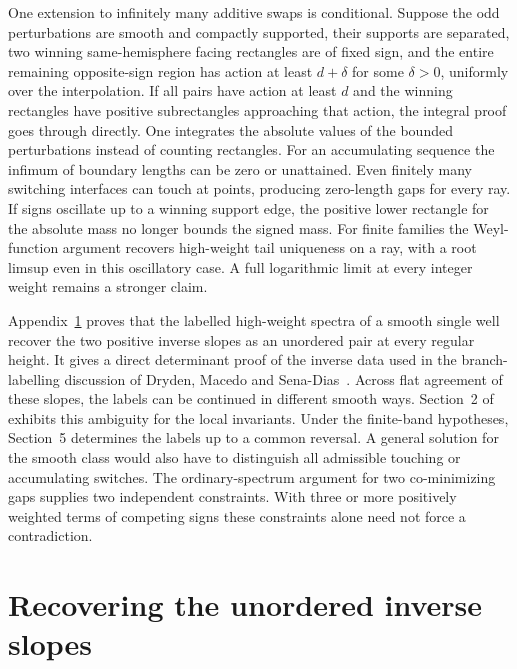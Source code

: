 \documentclass[11pt,letterpaper]{article}
\begin{document}
One extension to infinitely many additive swaps is conditional.
Suppose the odd perturbations are smooth and compactly supported, their
supports are separated, two winning same-hemisphere facing rectangles
are of fixed sign, and the entire remaining opposite-sign region has
action at least \(d+\delta\) for some \(\delta>0\), uniformly over the
interpolation. If all pairs have action at least \(d\) and the
winning rectangles have positive subrectangles approaching that action,
the integral proof goes through directly. One integrates the absolute
values of the bounded perturbations instead of counting rectangles.
For an accumulating sequence the infimum of boundary lengths can be
zero or unattained. Even finitely many switching interfaces can touch
at points, producing zero-length gaps for every ray. If signs oscillate
up to a winning support edge, the positive lower rectangle for the
absolute mass no longer bounds the signed mass. For finite families
the Weyl-function argument recovers high-weight tail uniqueness on
a ray, with a root limsup even in this oscillatory case. A full
logarithmic limit at every integer weight remains a stronger claim.

Appendix~\ref{app:inverse} proves that the labelled high-weight spectra
of a smooth single well recover the two positive inverse slopes as an
unordered pair at every regular height. It gives a direct determinant
proof of the inverse data used in the branch-labelling discussion of
Dryden, Macedo and Sena-Dias~\cite[final paragraph of Section~3]{dms}. Across flat agreement
of these slopes, the labels can be continued in different smooth ways.
Section~2 of \cite{original} exhibits this ambiguity for the local
invariants. Under the finite-band hypotheses, Section~5 determines
the labels up to a common reversal. A general solution for the smooth
class would also have to
distinguish all admissible touching or accumulating switches. The
ordinary-spectrum argument for two co-minimizing gaps supplies two
independent constraints. With three or more positively weighted
terms of competing signs these constraints alone need not force a
contradiction.

\clearpage
\appendix
{}\section{Recovering the unordered inverse slopes}\label{app:inverse}
\end{document}
